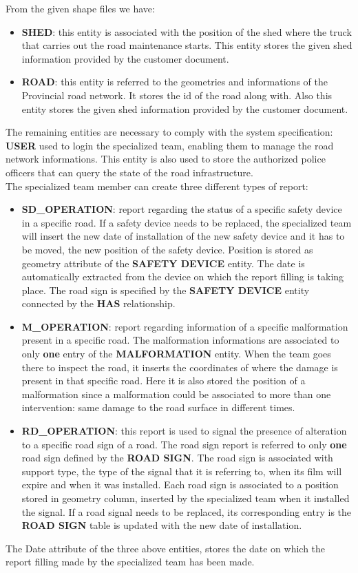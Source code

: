  From the given shape files we have:
 \begin{itemize}
     \item \textbf{SHED}: this entity is associated with the position of the shed where the truck that carries out the road maintenance starts. This entity stores the given shed information provided by the customer document. 
     \item \textbf{ROAD}: this entity is referred to the geometries and informations of the Provincial road network. It stores the id of the road along with.
     Also this entity stores the given shed information provided by the customer document.
     
 \end{itemize} 
 The remaining entities are necessary to comply with the system specification: \textbf{USER} used to login the specialized team, enabling them to manage the road network informations. This entity is also used to store the authorized police officers that can query the state of the road infrastructure.
 \\
 The specialized team member can create three different types of report:
 \begin{itemize}
     \item \textbf{SD\_OPERATION}: report regarding the status of a specific safety device in a specific road. If a safety device needs to be replaced, the specialized team will insert the new date of installation of the new safety device and it has to be moved, the new position of the safety device. 
     Position is stored as geometry attribute of the \textbf{SAFETY DEVICE} entity. The date is automatically extracted from the device on which the report filling is taking place.
     The road sign is specified by the \textbf{SAFETY DEVICE} entity connected by the \textbf{HAS} relationship. 
     \item \textbf{M\_OPERATION}: report regarding information of a specific malformation present in a specific road. The malformation informations are associated to only \textbf{one} entry of the \textbf{MALFORMATION} entity. When the team goes there to inspect the road, it inserts the coordinates of where the damage is present in that specific road. Here it is also stored the position of a malformation since a malformation could be associated to more than one intervention: same damage to the road surface in different times.
     \item \textbf{RD\_OPERATION}: this report is used to signal the presence of alteration to a specific road sign of a road. The road sign report is referred to only \textbf{one} road sign defined by the \textbf{ROAD SIGN}. The road sign is associated with support type, the type of the signal that it is referring to, when its film will expire and when it was installed. Each road sign is associated to a position stored in geometry column, inserted by the specialized team when it installed the signal.
     If a road signal needs to be replaced, its corresponding entry is the \textbf{ROAD SIGN} table is updated with the new date of installation. 
 \end{itemize}
    The Date attribute of the three above entities, stores the date on which the report filling made by the specialized team has been made.
 
